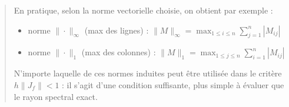 \documentclass[a4paper, 12pt]{article}
\begin{document}
\begin{enumerate}[resume]
\begin{enumerate}
\begin{quote}
       En pratique, selon la norme vectorielle choisie, on obtient par exemple :
       \begin{itemize}
           \item norme $\|\cdot\|_\infty$ (max des lignes) : $\|M\|_\infty = \displaystyle\max_{1 \le i \le n} \sum_{j=1}^n |M_{ij}|$
           \item norme $\|\cdot\|_1$ (max des colonnes) : $\|M\|_1 = \displaystyle\max_{1 \le j \le n} \sum_{i=1}^n |M_{ij}|$
       \end{itemize}
       N'importe laquelle de ces normes induites peut être utilisée dans le critère $h\|J_f\|<1$ : il s'agit d'une condition suffisante, plus simple à évaluer que le rayon spectral exact.
       \end{quote}
   \end{enumerate}

   \end{enumerate}
\end{document}
